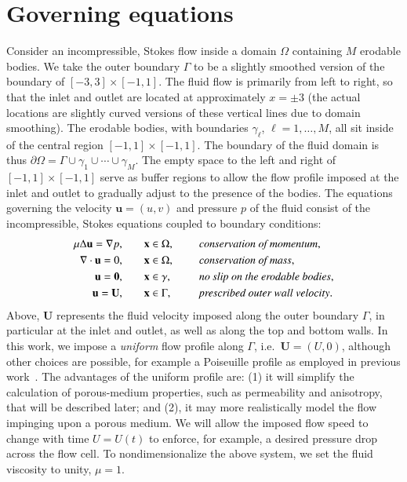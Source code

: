 \documentclass[3p]{elsarticle}
\newcommand{\bd}{{\partial}}
\newcommand{\grad}{{\nabla}}
\newcommand{\uu}{{\mathbf{u}}}
\newcommand{\UU}{{\mathbf{U}}}
\newcommand{\xx}{{\mathbf{x}}}
\def\gap{\hspace*{.2in}}
\begin{document}
\section{Governing equations}
\label{sec:formulation}

Consider an incompressible, Stokes flow inside a domain $\Omega$ containing $M$ erodable bodies. We take the outer boundary $\Gamma$ to be a slightly smoothed version of the boundary of $[-3,3] \times [-1,1]$. The fluid flow is primarily from left to right, so that the inlet and outlet are located at approximately $x=\pm 3$ (the actual locations are slightly curved versions of these vertical lines due to domain smoothing). The erodable bodies, with boundaries $\gamma_\ell$, $\ell = 1,\ldots,M$, all sit inside of the central region $[-1,1] \times [-1,1]$. The boundary of the fluid domain is thus $\bd \Omega = \Gamma \cup \gamma_1 \cup \cdots \cup \gamma_M$. The empty space to the left and right of $[-1,1] \times [-1,1]$ serve as buffer regions to allow the flow profile imposed at the inlet and outlet to gradually adjust to the presence of the bodies. The equations governing the velocity $\uu = (u,v)$ and pressure $p$ of the fluid consist of the incompressible, Stokes equations coupled to boundary conditions: \begin{equation}
\label{eqn:StokesEq}
  \begin{split}
    \mu \Delta \uu = \grad p, &\hspace{20pt} \xx \in \Omega, \gap 
      &&\mbox{\em conservation of momentum}, \\
    \grad \cdot \uu = 0, &\hspace{20pt} \xx \in \Omega, \gap 
      &&\mbox{\em conservation of mass}, \\
    \uu = \mathbf{0}, &\hspace{20pt} \xx \in \gamma, \gap 
      &&\mbox{\em no slip on the erodable bodies}, \\
    \uu = \UU, &\hspace{20pt} \xx \in \Gamma, \gap 
      &&\mbox{\em prescribed outer wall velocity}.
  \end{split}
\end{equation}
Above, $\UU$ represents the fluid velocity imposed along the outer boundary $\Gamma$, in particular at the inlet and outlet, as well as along the top and bottom walls. In this work, we impose a {\em uniform} flow profile along $\Gamma$, i.e.~$\UU = (U,0)$, although other choices are possible, for example a Poiseuille profile as employed in previous work~\cite{chiu2020viscous, quaife2018boundary}. The advantages of the uniform profile are: (1) it will simplify the calculation of porous-medium properties, such as permeability and anisotropy, that will be described later; and (2), it may more realistically model the flow impinging upon a porous medium. We will allow the imposed flow speed to change with time $U = U(t)$ to enforce, for example, a desired pressure drop across the flow cell. To nondimensionalize the above system, we set the fluid viscosity to unity, $\mu = 1$.
\end{document}
